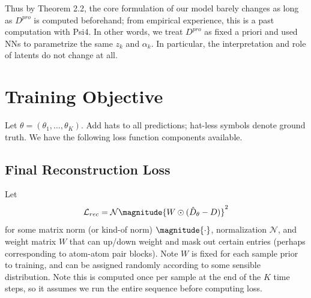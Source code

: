 \documentclass[12pt]{article}
\begin{document}
    Thus by Theorem 2.2, the core formulation of our model barely changes as long as $D^{pro}$ is computed beforehand; from empirical experience, this is a past computation with Psi4. In other words, we treat $D^{pro}$ as fixed a priori and used NNs to parametrize the same $z_k$ and $\alpha_k$. In particular, the interpretation and role of latents do not change at all. 

    \section{Training Objective}
    Let $\theta = (\theta_1, \ldots, \theta_K)$. Add hats to all predictions; hat-less symbols denote ground truth. We have the following loss function components available. 

    \subsection{Final Reconstruction Loss}
    Let 
    \begin{equation}
        \mathcal{L}_{rec} = \mathcal{N} \magnitude{W \odot (\hat D_\theta - D)}^2
    \end{equation}
    for some matrix norm (or kind-of norm) $\magnitude{ \cdot }$, normalization $\mathcal{N}$, and weight matrix $W$ that can up/down weight and mask out certain entries (perhaps corresponding to atom-atom pair blocks). Note $W$ is fixed for each sample prior to training, and can be assigned randomly according to some sensible distribution. Note this is computed once per sample at the end of the $K$ time steps, so it assumes we run the entire sequence before computing loss. 
\end{document}
